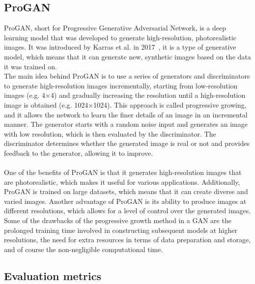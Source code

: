 \subsection{ProGAN}
\label{sec:proGAN}
ProGAN, short for Progressive Generative Adversarial Network, is a deep learning model that was developed to generate high-resolution, photorealistic images. It was introduced by Karras et al. in 2017~\cite{ProGAN}, it is a type of generative model, which means that it can generate new, synthetic images based on the data it was trained on.\\
The main idea behind ProGAN is to use a series of generators and discriminators to generate high-resolution images incrementally, starting from low-resolution images (e.g. 4×4) and gradually increasing the resolution until a high-resolution image is obtained (e.g. 1024×1024). This approach is called progressive growing, and it allows the network to learn the finer details of an image in an incremental manner. The generator starts with a random noise input and generates an image with low resolution, which is then evaluated by the discriminator. The discriminator determines whether the generated image is real or not and provides feedback to the generator, allowing it to improve. \\ \\
%
One of the benefits of ProGAN is that it generates high-resolution images that are photorealistic, which makes it useful for various applications. Additionally, ProGAN is trained on large datasets, which means that it can create diverse and varied images.
Another advantage of ProGAN is its ability to produce images at different resolutions, which allows for a level of control over the generated images. \\
Some of the drawbacks of the progressive growth method in a GAN are the prolonged training time involved in constructing subsequent models at higher resolutions, the need for extra resources in terms of data preparation and storage, and of course the non-negligible computational time.
%
%
%
\subsection{Evaluation metrics}
